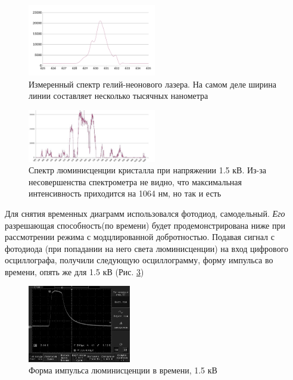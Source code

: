 \documentclass[twocolumn]{article}
\begin{document}
\begin{figure}[h!]
	\centering
	\includegraphics[width=0.5\textwidth]{LEMPH Report_files/red_lasar.png}
	\caption{Измеренный спектр гелий-неонового лазера. На самом деле ширина линии составляет несколько 				тысячных нанометра \label{fig:red_lasar}}
\end{figure}
    
        
\begin{figure}
	\includegraphics[width=0.5\textwidth]{LEMPH Report_files/LEMPH Report_17_0.jpeg}
	\caption{Спектр люминисценции кристалла при напряжении 1.5 кВ. Из-за несовершенства спектрометра не 			видно, что максимальная интенсивность приходится на 1064 нм, но так и есть \label{fig:lumina_spectrum}}
\end{figure}
           
Для снятия временных диаграмм использовался фотодиод, самодельный. \emph{Его} разрешающая способность(по времени) будет продемонстрирована ниже при рассмотрении режима с модцлированной добротностью.
Подавая сигнал с фотодиода (при попадании на него света люминисценции) на вход цифрового осциллографа, получили следующую осциллограмму, форму импульса во времени, опять же для 1.5 кВ (Рис. \ref{fig:lumina_pulse})

   
    \begin{figure}[h!]
    \centering
    \includegraphics[width=0.4\textwidth]{LEMPH Report_files/LEMPH Report_19_0.jpeg}
    \caption{Форма импульса люминисценции в времени, 1.5 кВ \label{fig:lumina_pulse}}
    \end{figure}
    
\end{document}
